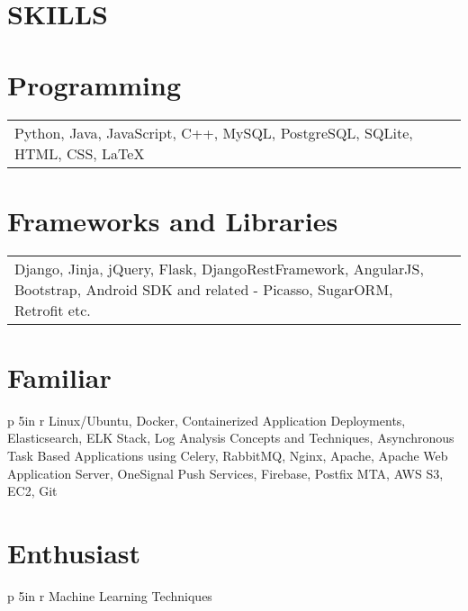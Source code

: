 \documentclass[margin]{res}
\begin{document}
\begin{resume}
\section{SKILLS} 
\normalsize{\section{Programming}}
                 \begin{tabular}{p{5in} r}
                 Python, Java, JavaScript, C++, MySQL, PostgreSQL, SQLite, HTML, CSS, LaTeX
                 \end{tabular}
\normalsize{\section{Frameworks and Libraries}} 
                 \begin{tabular}{p{5in} r}
                  Django, Jinja, jQuery, Flask, DjangoRestFramework, AngularJS, Bootstrap, Android SDK and related - Picasso, SugarORM, Retrofit etc.
                  \end{tabular}
\normalsize{\section{Familiar}}
	           \begin{tabular}{p {5in} r}
                   Linux/Ubuntu, Docker, Containerized Application Deployments, Elasticsearch, ELK Stack, Log Analysis Concepts and Techniques, Asynchronous Task Based Applications using Celery, RabbitMQ, Nginx, Apache, Apache Web Application Server, OneSignal Push Services, Firebase, Postfix MTA, AWS S3, EC2, Git
                   \end{tabular}
\normalsize{\section{Enthusiast}} 
                  \begin{tabular}{p {5in} r}
                  Machine Learning Techniques
                  \end{tabular}
 

\end{resume}
\end{document}

